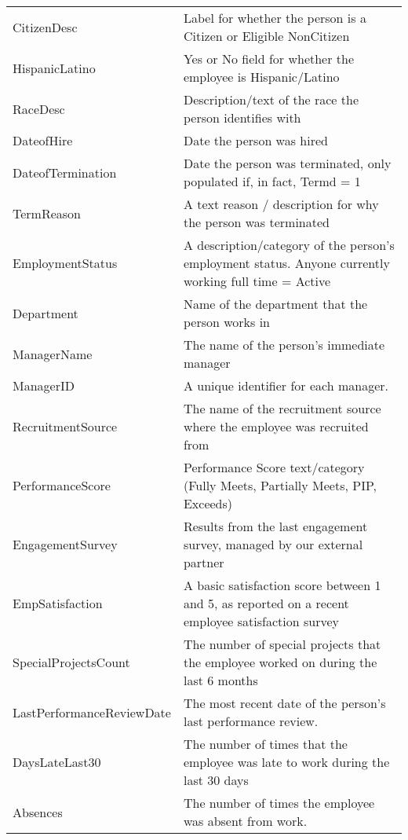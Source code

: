 \documentclass[11pt]{article}
\begin{document}
\begin{sidewaystable}[!hbtp]
\begin{small}
\begin{center}
\begin{tabular}[c]{l|l}
                        CitizenDesc  &  Label for whether the person is a Citizen or Eligible NonCitizen  \\
                        HispanicLatino  &  Yes or No field for whether the employee is Hispanic/Latino  \\
                        RaceDesc  &  Description/text of the race the person identifies with  \\
                        DateofHire  &  Date the person was hired \\
                        DateofTermination  &  Date the person was terminated, only populated if, in fact, Termd = 1  \\
                        TermReason  &  A text reason / description for why the person was terminated  \\
                        EmploymentStatus  &  A description/category of the person's employment status. Anyone currently working full time = Active  \\
                        Department  &  Name of the department that the person works in  \\
                        ManagerName  &  The name of the person's immediate manager  \\
                        ManagerID  &  A unique identifier for each manager.  \\
                        RecruitmentSource  &  The name of the recruitment source where the employee was recruited from  \\
                        PerformanceScore  &  Performance Score text/category (Fully Meets, Partially Meets, PIP, Exceeds)  \\
                        EngagementSurvey  &  Results from the last engagement survey, managed by our external partner  \\
                        EmpSatisfaction  &  A basic satisfaction score between 1 and 5, as reported on a recent employee satisfaction survey  \\
                        SpecialProjectsCount  &  The number of special projects that the employee worked on during the last 6 months  \\
                        LastPerformanceReviewDate  &  The most recent date of the person's last performance review.  \\
                        DaysLateLast30  &  The number of times that the employee was late to work during the last 30 days  \\
                        Absences  &  The number of times the employee was absent from work.  \\
			\end{tabular}
		\end{center}
	\end{small}
\end{sidewaystable}
\end{document}
